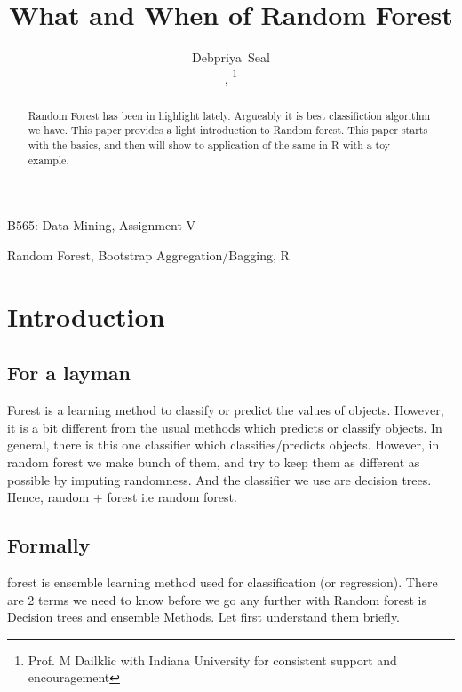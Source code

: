 \documentclass[journal]{IEEEtran}
\begin{document}
\title{What and When of Random Forest}

\author{Debpriya~Seal\\,%
\thanks{Prof. M Dailklic with Indiana University for consistent support and encouragement}%
}

%
{B565: Data Mining, Assignment V}
\maketitle


\begin{abstract}
Random Forest has been in highlight lately. Argueably it is best classifiction algorithm we have. This paper provides a light introduction to Random forest. This paper starts with the basics, and then will show to application of the same in R with a toy example. 
\end{abstract}
\begin{IEEEkeywords}
Random Forest, Bootstrap Aggregation/Bagging, R
\end{IEEEkeywords}

\IEEEpeerreviewmaketitle

\section{Introduction}

\subsection{For a layman}
 Forest  is a learning method to classify or predict the values of objects. However, it is a bit different from the usual methods which predicts or classify objects. In general, there is this one classifier which classifies/predicts objects. However, in random forest we make bunch of them, and try to keep them as different as possible by imputing randomness. And the classifier we use are decision trees. Hence, random + forest i.e random forest.
\subsection{Formally}
 forest is ensemble learning method used for classification (or regression). There are 2 terms we need to know before we go any further with Random forest is Decision trees and ensemble Methods. Let first understand them briefly.
\end{document}
